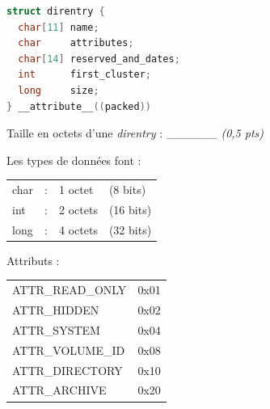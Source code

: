 \documentclass[11pt,a4paper]{article}
\begin{document}
\begin{table}[ht!]
  \centering
  \begin{minipage}{0.51\textwidth}
    \centering


\begin{lstlisting}[language=C]
struct direntry {
  char[11] name;
  char     attributes;
  char[14] reserved_and_dates;
  int      first_cluster;
  long     size;
} __attribute__((packed)) \end{lstlisting}

Taille en octets d'une \textit{direntry} : \_\_\_\_\_\_ \textit{(0,5 pts)}

  \end{minipage}
  \hfillx
  \begin{minipage}{0.39\textwidth}

Les types de données font :

\smallskip

\begin{tabular}{l l l l}
char & : & 1 octet  & (8 bits)  \\
int  & : & 2 octets & (16 bits) \\
long & : & 4 octets & (32 bits) \\
\end{tabular}


\medskip

Attributs :

\medskip

\begin{tabular}{l l}
ATTR\_READ\_ONLY & 0x01 \\
ATTR\_HIDDEN     & 0x02 \\
ATTR\_SYSTEM     & 0x04 \\
ATTR\_VOLUME\_ID & 0x08 \\
ATTR\_DIRECTORY  & 0x10 \\
ATTR\_ARCHIVE    & 0x20 \\
\end{tabular}

  \end{minipage}
\end{table}
\end{document}
